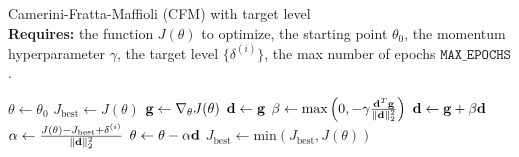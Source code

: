 \begin{algorithm}[htbp]
    \caption{Camerini-Fratta-Maffioli (CFM) with target level\\
        \textbf{Requires:} the function $J(\theta)$ to optimize, the starting point $\theta_0$, the momentum hyperparameter $\gamma$, the target level $\{\delta^{(i)}\}$, the max number of epochs $\texttt{MAX\_EPOCHS}$.
    }
    \label{alg:CFM-TL}
    \begin{algorithmic}
        \State $\theta \gets \theta_0$
        \State $J_{\text{best}} \gets J(\theta)$
            \State $\mathbf{g} \gets \nabla_\theta J(\theta)$
                \State $\mathbf{d} \gets \mathbf{g}$
            \Else
                \State $\beta \gets \text{max}\left(0, -\gamma\frac{\mathbf{d}^T\mathbf{g}}{\Vert\mathbf{d}\Vert_2^2}\right)$
                \State $\mathbf{d} \gets \mathbf{g}+\beta\mathbf{d}$
            \EndIf
            \State $\alpha \gets \frac{J(\theta) - J_{\text{best}} + \delta^{(i)}}{\Vert\mathbf{d}\Vert_2^2}$
            \State $\theta \gets \theta - \alpha\mathbf{d}$
            \State $J_{\text{best}} \gets \text{min}\left(J_{\text{best}}, J(\theta)\right)$
        \EndFor
    \end{algorithmic}
\end{algorithm}